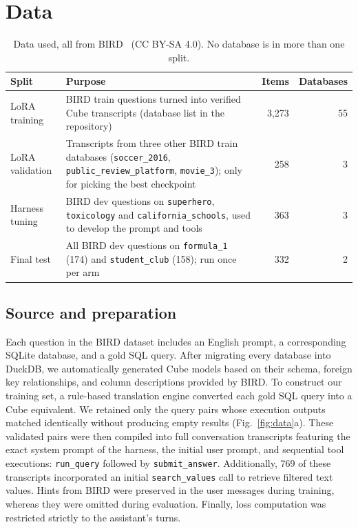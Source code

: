 \section{Data}
\begin{table}[!htbp]
\centering
\small
\caption{Data used, all from BIRD~\cite{li2023bird} (CC BY-SA 4.0). No database is in more than one split.}
\begin{tabularx}{\linewidth}{@{}l>{\raggedright\arraybackslash}Xrr@{}}
\toprule
\textbf{Split} & \textbf{Purpose} & \textbf{Items} & \textbf{Databases}\\
\midrule
LoRA training & BIRD train questions turned into verified Cube transcripts (database list in the repository) & 3,273 & 55\\
LoRA validation & Transcripts from three other BIRD train databases (\texttt{soccer\_2016}, \texttt{public\_review\_platform}, \texttt{movie\_3}); only for picking the best checkpoint & 258 & 3\\
Harness tuning & BIRD dev questions on \texttt{superhero}, \texttt{toxicology} and \texttt{california\_schools}, used to develop the prompt and tools & 363 & 3\\
Final test & All BIRD dev questions on \texttt{formula\_1} (174) and \texttt{student\_club} (158); run once per arm & 332 & 2\\
\bottomrule
\end{tabularx}
\end{table}

\subsection{Source and preparation}
Each question in the BIRD dataset includes an English prompt, a corresponding SQLite database, and a gold SQL query. After migrating every database into DuckDB, we automatically generated Cube models based on their schema, foreign key relationships, and column descriptions provided by BIRD. To construct our training set, a rule-based translation engine converted each gold SQL query into a Cube equivalent. We retained only the query pairs whose execution outputs matched identically without producing empty results (Fig.~\ref{fig:data}a). These validated pairs were then compiled into full conversation transcripts featuring the exact system prompt of the harness, the initial user prompt, and sequential tool executions: \texttt{run\_query} followed by \texttt{submit\_answer}. Additionally, 769 of these transcripts incorporated an initial \texttt{search\_values} call to retrieve filtered text values. Hints from BIRD were preserved in the user messages during training, whereas they were omitted during evaluation. Finally, loss computation was restricted strictly to the assistant's turns.


